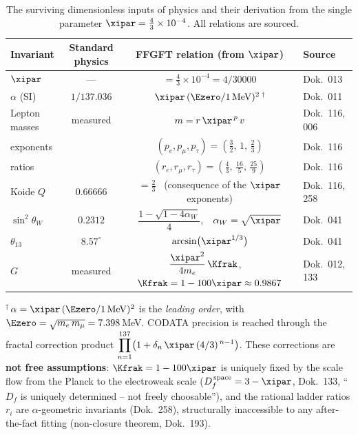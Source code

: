 \begin{table}[htbp]
  \centering
  \caption{The surviving dimensionless inputs of physics and their derivation from
           the single parameter $\xipar=\tfrac{4}{3}\times10^{-4}$. All relations
           are sourced.}
  \label{tab:xi-inputs-en}
  {\footnotesize\setlength{\tabcolsep}{4pt}
  \begin{tabular}{lccl}
    \toprule
    Invariant & Standard physics & FFGFT relation (from $\xipar$) & Source \\
    \midrule
    $\xipar$           & ---            & $=\tfrac{4}{3}\times10^{-4}=4/30000$ & Dok.~013 \\
    $\alpha$ (SI)      & $1/137{.}036$  & $\xipar\,(\Ezero/1\,\mathrm{MeV})^2$\,$^{\dagger}$ & Dok.~011 \\
    Lepton masses      & measured       & $m=r\,\xipar^{\,p}\,v$ & Dok.~116, 006 \\
    \quad exponents    &                & $(p_e,p_\mu,p_\tau)=(\tfrac{3}{2},\,1,\,\tfrac{2}{3})$ & Dok.~116 \\
    \quad ratios       &                & $(r_e,r_\mu,r_\tau)=(\tfrac{4}{3},\,\tfrac{16}{5},\,\tfrac{25}{9})$ & Dok.~116 \\
    Koide $Q$          & $0{.}66666$    & $=\tfrac{2}{3}$ \ (consequence of the $\xipar$ exponents) & Dok.~116, 258 \\
    $\sin^2\theta_W$   & $0{.}2312$     & $\dfrac{1-\sqrt{1-4\alpha_W}}{4}$,\ \ $\alpha_W=\sqrt{\xipar}$ & Dok.~041 \\[0.6em]
    $\theta_{13}$      & $8{.}57^\circ$ & $\arcsin\!\big(\xipar^{1/3}\big)$ & Dok.~041 \\
    $G$                & measured       & $\dfrac{\xipar^2}{4m_e}\,\Kfrak$,\ \ $\Kfrak=1-100\xipar\approx0{.}9867$ & Dok.~012, 133 \\
    \bottomrule
  \end{tabular}}

  \medskip
  \footnotesize
  $^{\dagger}$\,$\alpha=\xipar\,(\Ezero/1\,\mathrm{MeV})^2$ is the \emph{leading order},
  with $\Ezero=\sqrt{m_e\,m_\mu}=7{.}398$\,MeV.
  CODATA precision is reached through the fractal correction product
  $\displaystyle\prod_{n=1}^{137}\!\big(1+\delta_n\,\xipar\,(4/3)^{\,n-1}\big)$.
  These corrections are \textbf{not free assumptions}: $\Kfrak=1-100\xipar$ is uniquely
  fixed by the scale flow from the Planck to the electroweak scale
  ($D_f^{\,\mathrm{space}}=3-\xipar$, Dok.~133, ``$D_f$ is uniquely determined --
  not freely choosable''), and the rational ladder ratios $r_i$ are
  $\alpha$-geometric invariants (Dok.~258), structurally inaccessible to any
  after-the-fact fitting (non-closure theorem, Dok.~193).
\end{table}

